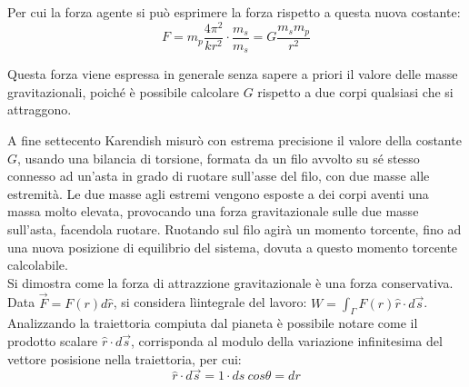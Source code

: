 \documentclass{article}
\numberwithin{equation}{subsection}
\begin{document}
Per cui la forza agente si può esprimere la forza rispetto a questa nuova costante:
\begin{equation}
    F=m_p\displaystyle\frac{4\pi^2}{kr^2}\cdot\frac{m_s}{m_s}=G\frac{m_sm_p}{r^2}
\end{equation}

Questa forza viene espressa in generale senza sapere a priori il valore delle masse gravitazionali, poiché è possibile calcolare $G$ rispetto a due 
corpi qualsiasi che si attraggono. 

A fine settecento Karendish misurò con estrema precisione il valore della costante $G$, usando una bilancia di torsione, formata da un filo avvolto 
su sé stesso connesso ad un'asta in grado di ruotare sull'asse del filo, con due masse alle estremità. Le due masse agli estremi vengono esposte 
a dei corpi aventi una massa molto elevata, provocando una forza gravitazionale sulle due masse sull'asta, facendola ruotare. Ruotando sul filo 
agirà un momento torcente, fino ad una nuova posizione di equilibrio del sistema, dovuta a questo momento torcente calcolabile.\\

Si dimostra come la forza di attrazzione gravitazionale è una forza conservativa. \\
Data $\vec{F}=F(r)d\hat{r}$, si considera lìintegrale del lavoro: $W=\displaystyle\int_{\Gamma}F(r)\hat{r}\cdot d\vec{s}$. Analizzando  
la traiettoria compiuta dal pianeta è possibile notare come il prodotto scalare $\hat{r}\cdot d\vec{s}$, corrisponda al modulo della variazione 
infinitesima del vettore posisione nella traiettoria, per cui:
\begin{equation}
    \hat{r}\cdot d\vec{s}=1\cdot ds\:cos\theta=dr
\end{equation}

\begin{center}
\end{center}
\end{document}
